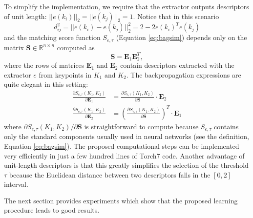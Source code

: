 \documentclass[10pt,conference,a4paper]{IEEEtran}
\begin{document}
		To simplify the implementation, we require that the extractor outputs descriptors of unit length: $||e(k_i)||_2=||e(k_j)||_2=1$.
		Notice that in this scenario
		$$
			d_{ij}^2=
			|| e(k_i) - e(k_j) ||_2^2 =
			2 - 2e(k_i)^Te(k_j)
		$$
		and the matching score function $S_{e, \tau}$ (Equation \eqref{eq:bagsim}) depends only on the matrix $\mathbf{S}\in\mathbb{R}^{n\times n}$ computed as
		$$
			\mathbf{S}=
			\mathbf{E}_1\mathbf{E}_2^T
			,
		$$
		where the rows of matrices $\mathbf{E}_1$ and $\mathbf{E}_2$ contain descriptors extracted with the extractor $e$ from keypoints in $K_1$ and $K_2$.
		The backpropagation expressions are quite elegant in this setting:
		\begin{align*}
			\frac{\partial S_{e, \tau}(K_1, K_2)}{\partial \mathbf{E}_1}&=\frac{\partial S_{e, \tau}(K_1, K_2)}{\partial \mathbf{S}}\cdot\mathbf{E}_2	\\
			\frac{\partial S_{e, \tau}(K_1, K_2)}{\partial \mathbf{E}_2}&=\left(\frac{\partial S_{e, \tau}(K_1, K_2)}{\partial \mathbf{S}}\right)^T\cdot\mathbf{E}_1
		\end{align*}
		where $\partial S_{e, \tau}(K_1, K_2)/\partial \mathbf{S}$ is straightforward to compute because $S_{e, \tau}$ contains only the standard components usually used in neural networks (see the definition, Equation \eqref{eq:bagsim}).
		The proposed computational steps can be implemented very efficiently in just a few hundred lines of Torch7 code.
		Another advantage of unit-length descriptors is that this greatly simplifies the selection of the threshold $\tau$ because the Euclidean distance between two descriptors falls in the $[0, 2]$ interval.

		The next section provides experiments which show that the proposed learning procedure leads to good results.
\end{document}
